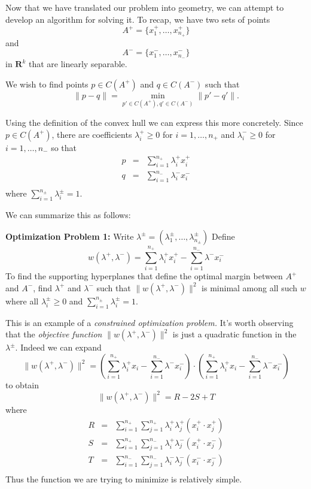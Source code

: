 \documentclass[
]{article}
\begin{document}
Now that we have translated our problem into geometry, we can attempt to
develop an algorithm for solving it. To recap, we have two sets of
points \[
A^{+}=\{x^+_1,\ldots, x^+_{n_{+}}\}
\] and \[
A^{-}=\{x^-_1,\ldots, x^-_{n_{-}}\}
\] in \(\mathbf{R}^{k}\) that are linearly separable.

We wish to find points \(p\in C(A^{+})\) and \(q\in C(A^{-})\) such that
\[
\|p-q\|=\min_{p'\in C(A^{+}),q'\in C(A^{-})} \|p'-q'\|.
\]

Using the definition of the convex hull we can express this more
concretely. Since \(p\in C(A^{+})\), there are coefficients
\(\lambda^{+}_{i}\ge 0\) for \(i=1,\ldots,n_{+}\) and
\(\lambda^{-}_{i}\ge 0\) for \(i=1,\ldots, n_{-}\) so that \[
\begin{aligned}
p&=&\sum_{i=1}^{n_{+}}\lambda^{+}_{i} x^{+}_{i} \\
q&=&\sum_{i=1}^{n_{-}}\lambda^{-}_{i} x^{-}_{i} \\
\end{aligned}
\] where \(\sum_{i=1}^{n_{\pm}} \lambda_{i}^{\pm}=1\).

We can summarize this as follows:

\textbf{Optimization Problem 1:} Write
\(\lambda^{\pm}=(\lambda^{\pm}_{1},\ldots, \lambda^{\pm}_{n_{\pm}})\)
Define \[
w(\lambda^+,\lambda^-) = \sum_{i=1}^{n_{+}}\lambda^{+}_{i}x^{+}_{i} - \sum_{i=1}^{n_{-}}\lambda^{-}x^{-}_{i}
\] To find the supporting hyperplanes that define the optimal margin
between \(A^{+}\) and \(A^{-}\), find \(\lambda^{+}\) and
\(\lambda^{-}\) such that \(\|w(\lambda^{+},\lambda^{-})\|^2\) is
minimal among all such \(w\) where all \(\lambda^{\pm}_{i}\ge 0\) and
\(\sum_{i=1}^{n_{\pm}} \lambda^{\pm}_{i}=1\).

This is an example of a \emph{constrained optimization problem.} It's
worth observing that the \emph{objective function}
\(\|w(\lambda^{+},\lambda^{-})\|^2\) is just a quadratic function in the
\(\lambda^{\pm}\). Indeed we can expand \[
\|w(\lambda^{+},\lambda^{-})\|^2 = (\sum_{i=1}^{n_{+}}\lambda^{+}_{i}x_{i}- \sum_{i=1}^{n_{-}}\lambda^{-}x^{-}_{i})\cdot(\sum_{i=1}^{n_{+}}\lambda^{+}_{i}x_{i}- \sum_{i=1}^{n_{-}}\lambda^{-}x^{-}_{i})
\] to obtain \[
\|w(\lambda^{+},\lambda^{-})\|^2 = R -2S +T
\] where \[
\begin{aligned}
R &=& \sum_{i=1}^{n_{+}}\sum_{j=1}^{n_{+}}\lambda^{+}_{i}\lambda^{+}_{j}(x^{+}_{i}\cdot x^{+}_{j}) \\
S &=& \sum_{i=1}^{n_{+}}\sum_{j=1}^{n_{-}}\lambda^{+}_{i}\lambda^{-}_{j}(x^{+}_{i}\cdot x^{-}_{j}) \\
T &=& \sum_{i=1}^{n_{-}}\sum_{j=1}^{n_{-}}\lambda^{-}_{i}\lambda^{-}_{j}(x^{-}_{i}\cdot x^{-}_{j}) \\
\end{aligned}
\] Thus the function we are trying to minimize is relatively simple.
\end{document}
